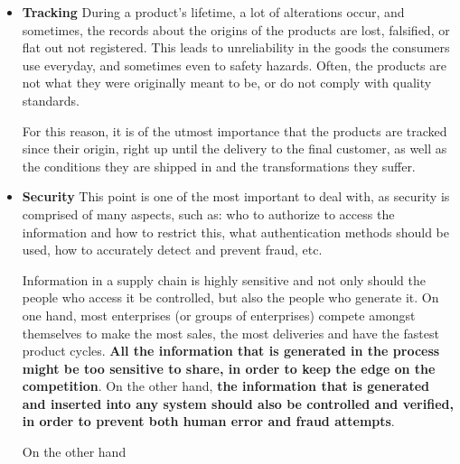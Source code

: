 \begin{itemize}
\item \textbf{Tracking}
During a product's lifetime, a lot of alterations occur, and sometimes, the records about the origins of the products are lost, falsified, or flat out not registered. This leads to unreliability in the goods the consumers use everyday, and sometimes even to safety hazards. Often, the products are not what they were originally meant to be, or do not comply with quality standards.



For this reason, it is of the utmost importance that the products are tracked since their origin, right up until the delivery to the final customer, as well as the conditions they are shipped in and the transformations they suffer.

\item \textbf{Security}
This point is one of the most important to deal with, as security is comprised of many aspects, such as: who to authorize to access the information and how to restrict this, what authentication methods should be used, how to accurately detect and prevent fraud, etc. 

Information in a supply chain is highly sensitive and not only should the people who access it be controlled, but also the people who generate it.  On one hand, most enterprises (or groups of enterprises) compete amongst themselves to make the most sales, the most deliveries and have the fastest product cycles. \textbf{All the information that is generated in the process might be too sensitive to share, in order to keep the edge on the competition}.
On the other hand, \textbf{the information that is generated and inserted into any system should also be controlled and verified, in order to prevent both human error and fraud attempts}.


On the other hand

\end{itemize}

